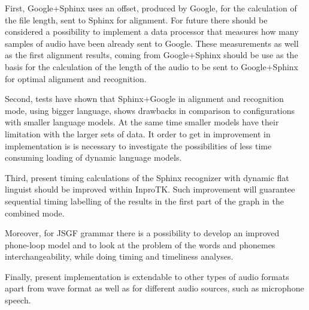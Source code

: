 First, Google+Sphinx uses an offset, produced by Google, for the calculation of the file length, sent to 
Sphinx for alignment. For future there should be considered a possibility to implement a data
processor that measures how many samples of audio  have been already sent to
Google.  These measurements as well as the first alignment results, coming from
Google+Sphinx should be use as the basis for the calculation of the length of the audio to be sent to Google+Sphinx for 
optimal alignment and recognition.

Second, tests have shown that Sphinx+Google in alignment and recognition mode,
using bigger language, shows drawbacks in comparison to configurations with smaller
language models. At the same time smaller models have their limitation with the
larger sets of data.  It order to get in improvement in implementation is is
necessary to investigate the possibilities of less time consuming loading of
dynamic language models.

Third, present timing calculations of the Sphinx recognizer with dynamic flat
linguist should be improved within InproTK. Such improvement will guarantee
sequential timing labelling of the results in the first part of the graph in
the combined mode.

Moreover, for JSGF grammar there is a possibility to develop an improved
phone-loop model and to look at the problem of the words and phonemes
interchangeability, while doing timing and timeliness analyses. 

Finally, present implementation is extendable to other types of audio formats
apart from wave format as well as for different audio sources, such as microphone speech. 



